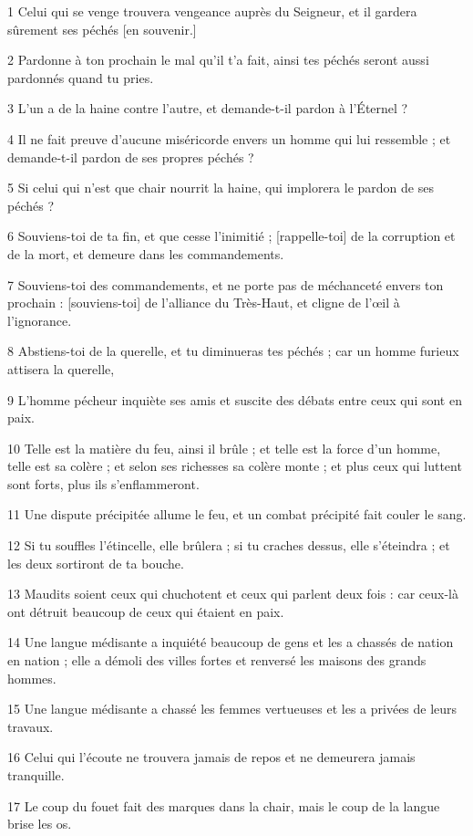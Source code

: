 \par 1 Celui qui se venge trouvera vengeance auprès du Seigneur, et il gardera sûrement ses péchés [en souvenir.]
\par 2 Pardonne à ton prochain le mal qu'il t'a fait, ainsi tes péchés seront aussi pardonnés quand tu pries.
\par 3 L'un a de la haine contre l'autre, et demande-t-il pardon à l'Éternel ?
\par 4 Il ne fait preuve d'aucune miséricorde envers un homme qui lui ressemble ; et demande-t-il pardon de ses propres péchés ?
\par 5 Si celui qui n'est que chair nourrit la haine, qui implorera le pardon de ses péchés ?
\par 6 Souviens-toi de ta fin, et que cesse l'inimitié ; [rappelle-toi] de la corruption et de la mort, et demeure dans les commandements.
\par 7 Souviens-toi des commandements, et ne porte pas de méchanceté envers ton prochain : [souviens-toi] de l'alliance du Très-Haut, et cligne de l'œil à l'ignorance.
\par 8 Abstiens-toi de la querelle, et tu diminueras tes péchés ; car un homme furieux attisera la querelle,
\par 9 L'homme pécheur inquiète ses amis et suscite des débats entre ceux qui sont en paix.
\par 10 Telle est la matière du feu, ainsi il brûle ; et telle est la force d'un homme, telle est sa colère ; et selon ses richesses sa colère monte ; et plus ceux qui luttent sont forts, plus ils s'enflammeront.
\par 11 Une dispute précipitée allume le feu, et un combat précipité fait couler le sang.
\par 12 Si tu souffles l'étincelle, elle brûlera ; si tu craches dessus, elle s'éteindra ; et les deux sortiront de ta bouche.
\par 13 Maudits soient ceux qui chuchotent et ceux qui parlent deux fois : car ceux-là ont détruit beaucoup de ceux qui étaient en paix.
\par 14 Une langue médisante a inquiété beaucoup de gens et les a chassés de nation en nation ; elle a démoli des villes fortes et renversé les maisons des grands hommes.
\par 15 Une langue médisante a chassé les femmes vertueuses et les a privées de leurs travaux.
\par 16 Celui qui l'écoute ne trouvera jamais de repos et ne demeurera jamais tranquille.
\par 17 Le coup du fouet fait des marques dans la chair, mais le coup de la langue brise les os.
